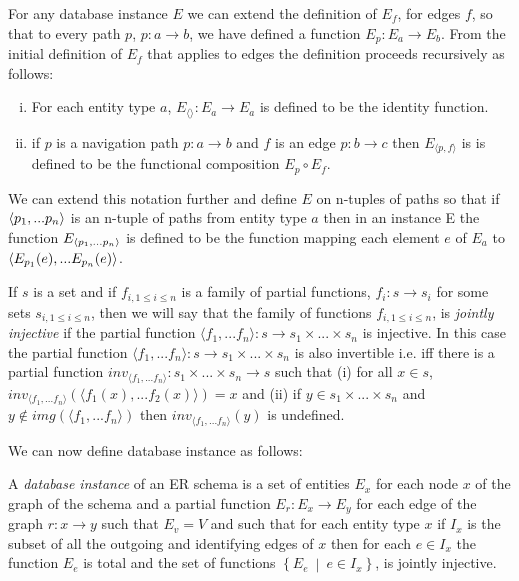 \documentclass[10pt,a4paper]{article}
\newcommand{\setsuchthat}[2]{\left\{#1 \ \middle|\ #2\right\}}
\newcommand{\veee}{v}
\newcommand{\Veee}{V}
\newcommand{\term}[1]{\textit{{#1}}}
\begin{document}
\noindent For any database instance $E$ we can  extend  the definition of
$E_f$, for edges $f$,  so that to every path $p$, $p: a \rightarrow b$,  we have defined a function $E_p: E_a \rightarrow E_b$. From the initial definition of $E_f$ that applies to 
edges the definition proceeds recursively as follows: 
\begin{enumerate} [(i)]
\item{  For each entity type $a$, $E_{\langle \rangle}: E_a \rightarrow E_a$ is defined to be the identity function.
}
\item{   if $p$ is a navigation path $p: a \rightarrow b$ and $f$ is an edge $p: b \rightarrow c$ then $E_{\langle p,f \rangle}$ is 
is defined to be the functional composition $E_p \circ E_f$.
}
\end{enumerate}

We can extend this notation further and define $E$ on n-tuples of paths so that if 
$\langle p_1,...p_n\rangle$ is an n-tuple of paths from entity type $a$ then in an instance E
the function  $E_{\langle p_1,...p_n\rangle}$ is defined to be the function mapping each element $e$ 
of $E_a$ to 
$\langle E_{p_1}(e),...E_{p_n}(e)\rangle$.

\begin{definition}
If $s$ is a set and if $f_{i, 1\leq i \leq n}$ is a family of partial functions, $f_i: s \rightarrow s_i$   for some sets $s_{i, 1 \leq i \leq n}$,  then
we will say that the family of functions $f_{i, 1\leq i \leq n}$, is \term{jointly injective} if the partial function $\langle f_1,...f_n\rangle: s \rightarrow
s_1 \times ... \times s_n $ is injective. In this case the partial function $\langle f_1,...f_n\rangle: s \rightarrow
s_1 \times ... \times s_n $ is also invertible i.e. iff there is a partial function $inv_{\langle f_1,...f_n\rangle} : s_1 \times ... \times s_n \rightarrow s$ such that
(i) for all $x \in s$, $inv_{\langle f_1,...f_n\rangle}(\langle f_1(x),...f_2(x) \rangle ) = x$ and (ii) if $y \in s_1 \times ... \times s_n $ and
$y \notin img(\langle f_1,...f_n\rangle)$ then $inv_{\langle f_1,...f_n\rangle}(y)$ is undefined. \\
\end{definition}

\noindent We can now define database instance as follows:
\begin{definition}
\noindent A \term{database instance}  of an ER schema is
a set of entities $E_x$ for each node $x$ of the graph of the schema and 
a partial function $E_r : E_x \rightarrow E_y$ for each edge of the graph $r:x \rightarrow y$ 
such that $E_\veee=\Veee$
and such that 
for each entity type $x$ if $I_x$ is the subset of all the outgoing and identifying edges
of $x$ then for each $e \in I_x$ the function $E_e$ is total and
the set of functions $\setsuchthat{E_e}{e \in I_x}$, is jointly injective.
\end{definition}
\end{document}
